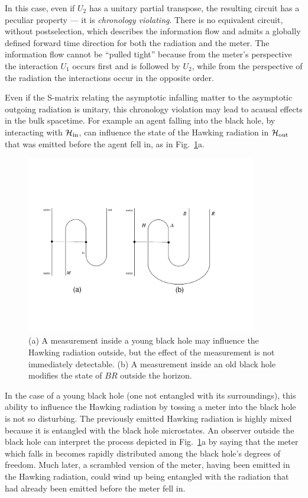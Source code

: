 \documentclass[11pt]{article}
\begin{document}
In this case, even if $U_2$ has a unitary partial transpose, the resulting circuit has a peculiar property --- it is {\em chronology violating}. There is no equivalent circuit, without postselection, which describes the information flow and admits a globally defined forward time direction for both the radiation and the meter. The information flow cannot be ``pulled tight'' because from the meter's perspective the interaction $U_1$ occurs first and is followed by $U_2$, while from the perspective of the radiation the interactions occur in the opposite order. 

Even if the S-matrix relating the asymptotic infalling matter to the asymptotic outgoing radiation is unitary, this chronology violation may lead to acausal effects in the bulk spacetime. For example an agent falling into the black hole, by interacting with $\mathcal{H}_{\rm in}$, can influence the state of the Hawking radiation in $\mathcal{H}_{\rm out}$ that was emitted before the agent fell in, as in Fig.~\ref{fig:acausal}a. 

\begin{figure}[t]
\begin{center}
\includegraphics[width=0.9\textwidth]{acausal.pdf}
\end{center}
\caption{(a) A measurement inside a young black hole may influence the Hawking radiation outside, but the effect of the measurement is not immediately detectable. (b) A measurement inside an old black hole modifies the state of $BR$ outside the horizon.}
\label{fig:acausal}
\end{figure}


In the case of a young black hole (one not entangled with its surroundings), this ability to influence the Hawking radiation by tossing a meter into the black hole is not so disturbing. The previously emitted Hawking radiation is highly mixed because it is entangled with the black hole microstates. An observer outside the black hole can interpret the process depicted in Fig.~\ref{fig:acausal}a by saying that the meter which falls in becomes rapidly distributed among the black hole's degrees of freedom. Much later, a scrambled version of the meter, having been emitted in the Hawking radiation, could wind up being entangled with the radiation that had already been emitted before the meter fell in.
\end{document}

